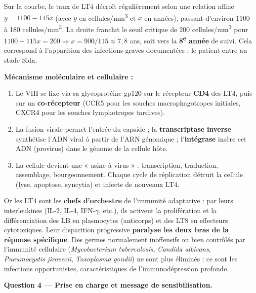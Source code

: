 \documentclass[11pt]{article}
\newcommand{\cle}[1]{{\popxbold\color{popdark}#1}}
\begin{document}
\begin{exoresolu}
Sur la courbe, le taux de LT4 décroît régulièrement selon une relation affine $y = 1100 - 115x$ (avec $y$ en cellules/mm\textsuperscript{3} et $x$ en années), passant d'environ 1100 à 180 cellules/mm\textsuperscript{3}. La droite franchit le seuil critique de 200 cellules/mm\textsuperscript{3} pour $1100 - 115x = 200 \Rightarrow x = 900/115 \approx 7,8$ ans, soit vers la \textbf{8\textsuperscript{e} année} de suivi. Cela correspond à l'apparition des infections graves documentées : le patient entre au stade \cle{Sida}.

\textbf{Mécanisme moléculaire et cellulaire :}
\begin{enumerate}
\item Le VIH se fixe via sa glycoprotéine gp120 sur le récepteur \textbf{CD4} des LT4, puis sur un \textbf{co-récepteur} (CCR5 pour les souches macrophagotropes initiales, CXCR4 pour les souches lymphotropes tardives).
\item La fusion virale permet l'entrée du capside ; la \textbf{transcriptase inverse} synthétise l'ADN viral à partir de l'ARN génomique ; l'\textbf{intégrase} insère cet ADN (provirus) dans le génome de la cellule hôte.
\item La cellule devient une « usine à virus » : transcription, traduction, assemblage, bourgeonnement. Chaque cycle de réplication détruit la cellule (lyse, apoptose, syncytia) et infecte de nouveaux LT4.
\end{enumerate}
Or les LT4 sont les \textbf{chefs d'orchestre} de l'immunité adaptative : par leurs interleukines (IL-2, IL-4, IFN-$\gamma$, etc.), ils activent la prolifération et la différenciation des LB en plasmocytes (anticorps) et des LT8 en effecteurs cytotoxiques. Leur disparition progressive \textbf{paralyse les deux bras de la réponse spécifique}. Des germes normalement inoffensifs ou bien contrôlés par l'immunité cellulaire (\emph{Mycobacterium tuberculosis}, \emph{Candida albicans}, \emph{Pneumocystis jirovecii}, \emph{Toxoplasma gondii}) ne sont plus éliminés : ce sont les \cle{infections opportunistes}, caractéristiques de l'immunodépression profonde.

\textbf{Question 4 — Prise en charge et message de sensibilisation.}


\end{exoresolu}
\end{document}
